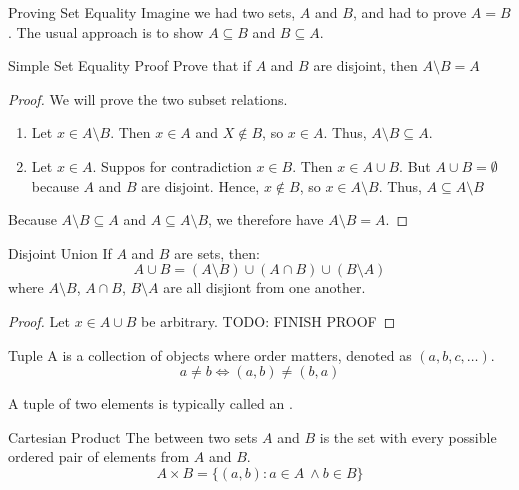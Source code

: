 \documentclass[letterpaper,12pt]{report}
\begin{document}
\begin{tecbox}{Proving Set Equality}{}
	Imagine we had two sets, $A$ and $B$, and had to prove $A = B$. The usual approach is to show $A \subseteq B$ and $B \subseteq A$.
\end{tecbox}

\begin{exbox}{Simple Set Equality Proof}{}
	Prove that if $A$ and $B$ are disjoint, then $A\setminus B = A$
	\tcblower
	\begin{proof}
		We will prove the two subset relations.
		\begin{enumerate}
			\item Let $x \in A \setminus B$. Then $x \in A$ and $X \notin B$, so $x \in A$. Thus, $A \setminus B \subseteq A$.

			\item Let $x \in A$. Suppos for contradiction $x \in B$. Then $x \in A \cup B$. But $A \cup B = \emptyset$ because $A$ and $B$ are disjoint. Hence, $x \notin B$, so $x \in A \setminus B$. Thus, $A \subseteq A \setminus B$
		\end{enumerate}

		Because $A\setminus B \subseteq A$ and $A \subseteq A \setminus B$, we therefore have $A \setminus B = A$.
	\end{proof}
\end{exbox}

\begin{thmbox}{Disjoint Union}{}
	If $A$ and $B$ are sets, then:
	\[ A \cup B = (A \setminus B) \cup (A \cap B) \cup (B \setminus A)\]
	where $A \setminus B$, $A \cap B$, $B \setminus A$ are all disjiont from one another.
	\tcblower
	\begin{proof}
		Let $x \in A \cup B$ be arbitrary. TODO: FINISH PROOF
	\end{proof}
\end{thmbox}

\begin{dfnbox}{Tuple}{}
	A  is a collection of objects where order matters, denoted as $(a, b, c, \ldots)$.
	\[a \neq b \iff (a,b) \neq (b,a)\]
\end{dfnbox}

A tuple of two elements is typically called an .

\begin{dfnbox}{Cartesian Product}{}
    The  between two sets $A$ and $B$ is the set with every possible ordered pair of elements from $A$ and $B$.
	\tcblower
    \[A \times B = \{ (a,b) : a \in A\ \land b \in B\}\]
\end{dfnbox}
\end{document}
